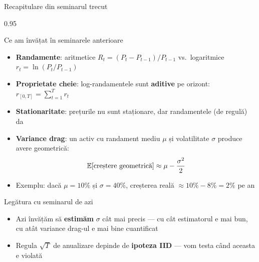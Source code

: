 \documentclass[9pt, aspectratio=169, t]{beamer}
\begin{document}
\begin{frame}[shrink=10]{Recapitulare din seminarul trecut}
    \begin{cminipage}{0.95\textwidth}
    \begin{block}{ Ce am învățat în seminarele anterioare}
    \begin{itemize}\setlength{\itemsep}{0pt}
        \item \textbf{Randamente}: aritmetice $R_t = (P_t - P_{t-1})/P_{t-1}$ vs.\ logaritmice $r_t = \ln(P_t/P_{t-1})$
        \item \textbf{Proprietate cheie}: log-randamentele sunt \textbf{aditive} pe orizont: $r_{[0,T]} = \sum_{t=1}^T r_t$
        \item \textbf{Stationaritate}: prețurile nu sunt staționare, dar randamentele (de regulă) da
        \item \textbf{Variance drag}: un activ cu randament mediu $\mu$ și volatilitate $\sigma$ produce avere geometrică:
        \[
        \mathbb{E}[\text{creștere geometrică}] \approx \mu - \frac{\sigma^2}{2}
        \]
        \item Exemplu: dacă $\mu = 10\%$ și $\sigma = 40\%$, creșterea reală $\approx 10\% - 8\% = 2\%$ pe an
    \end{itemize}
    \end{block}
    \vspace{0.1cm}
    \begin{alertblock}{ Legătura cu seminarul de azi}
    \begin{itemize}\setlength{\itemsep}{0pt}
        \item Azi învățăm să \textbf{estimăm} $\sigma$ cât mai precis --- cu cât estimatorul e mai bun, cu atât variance drag-ul e mai bine cuantificat
        \item Regula $\sqrt{T}$ de anualizare depinde de \textbf{ipoteza IID} --- vom testa când aceasta e violată
    \end{itemize}
    \end{alertblock}
    \end{cminipage}
\end{frame}
\end{document}
